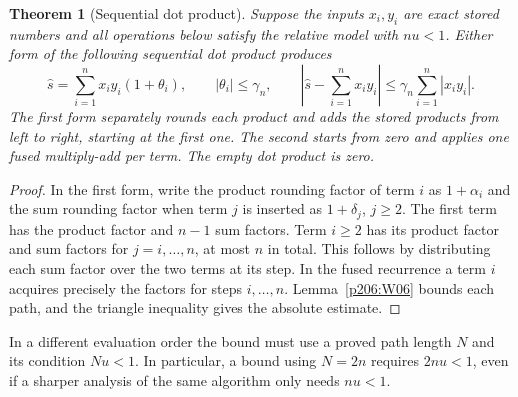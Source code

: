 \documentclass[11pt,oneside,openany]{book}
\theoremstyle{plain}
\newtheorem{theorem}{Theorem}[chapter]
\theoremstyle{definition}
\theoremstyle{remark}
\begin{document}
\begin{theorem}[Sequential dot product]\label{p206:W07}
Suppose the inputs \(x_i,y_i\) are exact stored numbers and all
operations below satisfy the relative model with \(nu<1\).
Either form of the following sequential dot product produces
\[
 \widehat s=\sum_{i=1}^n x_i y_i(1+\theta_i),\qquad
 |\theta_i|\le\gamma_n,\qquad
 \left|\widehat s-\sum_{i=1}^n x_i y_i\right|
       \le\gamma_n\sum_{i=1}^n |x_i y_i|.
\]
The first form separately rounds each product and adds the stored
products from left to right, starting at the first one. The second
starts from zero and applies one fused multiply-add per term.
The empty dot product is zero.
\end{theorem}
\begin{proof}
In the first form, write the product rounding factor of term
\(i\) as \(1+\alpha_i\) and the sum rounding factor when term \(j\)
is inserted as \(1+\delta_j\), \(j\ge2\).
The first term has the product factor and \(n-1\) sum factors.
Term \(i\ge2\) has its product factor and sum factors for
\(j=i,\ldots,n\), at most \(n\) in total. This follows by
distributing each sum factor over the two terms at its step.
In the fused recurrence a term \(i\) acquires precisely the factors
for steps \(i,\ldots,n\). Lemma~\ref{p206:W06} bounds each
path, and the triangle inequality gives the absolute estimate.
\end{proof}
In a different evaluation order the bound must use a proved path
length \(N\) and its condition \(Nu<1\). In particular, a bound
using \(N=2n\) requires \(2nu<1\), even if a sharper analysis of
the same algorithm only needs \(nu<1\).
\end{document}
